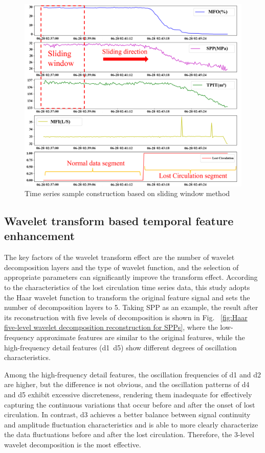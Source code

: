 \documentclass[journal,article,submit,pdftex,moreauthors]{Definitions/mdpi}
\begin{document}
\begin{figure}[H]
    \centering
    \includegraphics[width=0.85\linewidth]{图片/滑动窗口.png}
    \caption{Time series sample construction based on sliding window method}
    \label{fig:Time series sample construction based on sliding window method}
\end{figure}

\subsection{Wavelet transform based temporal feature enhancement}

The key factors of the wavelet transform effect are the number of wavelet decomposition layers and the type of wavelet function, and the selection of appropriate parameters can significantly improve the transform effect. According to the characteristics of the lost circulation time series data, this study adopts the Haar wavelet function to transform the original feature signal and sets the number of decomposition layers to 5. Taking SPP as an example, the result after its reconstruction with five levels of decomposition is shown in Fig.  \ref{fig:Haar five-level wavelet decomposition reconstruction for SPPs}, where the low-frequency approximate features are similar to the original features, while the high-frequency detail features (d1~d5) show different degrees of oscillation characteristics.

Among the high-frequency detail features, the oscillation frequencies of d1 and d2 are higher, but the difference is not obvious, and the oscillation patterns of d4 and d5 exhibit excessive discreteness, rendering them inadequate for effectively capturing the continuous variations that occur before and after the onset of lost circulation. In contrast, d3 achieves a better balance between signal continuity and amplitude fluctuation characteristics and is able to more clearly characterize the data fluctuations before and after the lost circulation. Therefore, the 3-level wavelet decomposition is the most effective.
\end{document}
